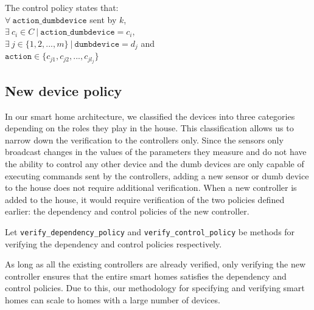 \documentclass{article}
\begin{document}
\noindent The control policy states that:\\

\noindent $\forall~\mathit{\texttt{action\_dumbdevice}}$ sent by $k$, \\
$\exists~ c_i \in C~|~\texttt{action\_dumbdevice} = c_i$, \\
$ \exists~ j \in \{1, 2, ..., m\}~|~ \mathit{\texttt{dumbdevice} = d_j}$ and\\ $\texttt{action} \in \{c_{j1}, c_{j2}, ..., c_{jl_j}\}$


\subsection{New device policy}
\label{subsec:newitem}
In our smart home architecture, we classified the devices into three categories depending on the roles they play in the house. This classification allows us to narrow down the verification to the controllers only. 
Since the sensors only broadcast changes in the values of the parameters they measure and do not have the ability to control any other device and the dumb devices are only capable of executing commands sent by the controllers, adding a new sensor or dumb device to the house does not require additional verification. 
When a new controller is added to the house, it would require verification of the two policies defined earlier: the dependency and control policies of the new controller. 

\noindent Let \texttt{verify\_dependency\_policy} and \texttt{verify\_control\_policy} be methods for verifying the dependency and control policies respectively.

As long as all the existing controllers are already verified, only verifying the new controller ensures that the entire smart homes satisfies the dependency and control policies. Due to this, our methodology for specifying and verifying smart homes can scale to homes with a large number of devices.
\end{document}

